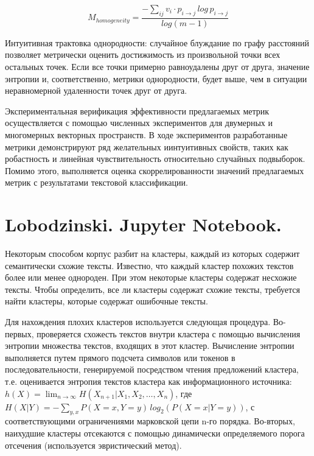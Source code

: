 \[M_{homogeneity} = \frac{-\sum_{ij}v_i \cdot p_{i\to j}\,log\,p_{i\to j}}{log(m-1)}\]

\noindent Интуитивная трактовка однородности: случайное блуждание по графу расстояний позволяет метрически оценить достижимость из произвольной точки всех остальных точек. Если все точки примерно равноудалены друг от друга, значение энтропии и, соответственно, метрики однородности, будет выше, чем в ситуации неравномерной удаленности точек друг от друга. 

Экспериментальная верификация эффективности предлагаемых метрик осуществляется с помощью численных экспериментов для двумерных и многомерных векторных пространств. В ходе экспериментов разработанные метрики демонстрируют ряд желательных иинтуитивных свойств, таких как робастность и линейная чувствительность относительно случайных подвыборок. Помимо этого, выполняется оценка скоррелированности значений предлагаемых метрик с результатами текстовой классификации.

\section{Lobodzinski. Jupyter Notebook.}

Некоторым способом корпус разбит на кластеры, каждый из которых содержит семантически схожие тексты. Известно, что каждый кластер похожих текстов более или менее однороден. При этом некоторые кластеры содержат несхожие тексты. Чтобы определить, все ли кластеры содержат схожие тексты, требуется найти кластеры, которые содержат ошибочные тексты. 

Для нахождения плохих кластеров используется следующая процедура. Во-первых, проверяется схожесть текстов внутри кластера с помощью вычисления энтропии множества текстов, входящих в этот кластер. Вычисление энтропии выполняется путем прямого подсчета символов или токенов в последовательности, генерируемой посредством чтения предложений кластера, т.е. оценивается энтропия текстов кластера как информационного источника: $h(X) = \lim_{n \to \infty}H(X_{n+1}|X_1, X_2, \ldots, X_n)$, где $H(X|Y) = -\sum_{y,x}P(X = x, Y = y)
\,log_2(P(X = x | Y = y))$, с соответствующими ограничениями марковской цепи n-го порядка. Во-вторых, наихудшие кластеры отсекаются с помощью динамически определяемого порога отсечения (используется эвристический метод).